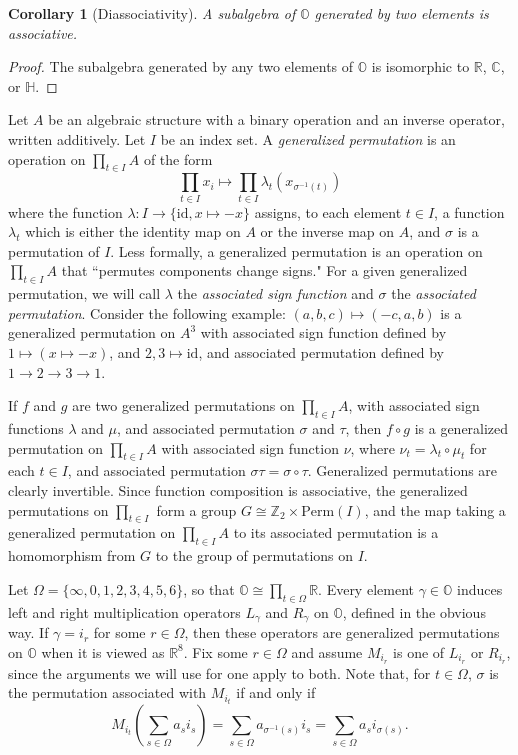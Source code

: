 \documentclass[10pt]{amsart}
\newcommand{\Z}{\mathbb{Z}}
\newcommand{\R}{\mathbb{R}}
\newcommand{\C}{\mathbb{C}}
\renewcommand{\H}{\mathbb{H}}
\renewcommand{\O}{\mathbb{O}}
\newtheorem{cor}[thm]{Corollary}
\begin{document}
\begin{cor}[Diassociativity]
\normalfont
A subalgebra of $\O$ generated by two elements is associative.
\end{cor}
\begin{proof}
The subalgebra generated by any two elements of $\O$ is isomorphic to $\R$, $\C$, or $\H$.
\end{proof}

Let $A$ be an algebraic structure with a binary operation and an inverse operator, written additively. Let $I$ be an index set.  A \emph{generalized permutation} is an operation on $\prod_{t \in I} A$ of the form
$$
\prod_{t \in I} x_i \mapsto \prod_{t \in I}\lambda_t (x_{\sigma^{-1}(t)})
$$
where the function $\lambda: I \rightarrow \{\text{id}, x \mapsto -x\}$ assigns, to each element $t \in I$, a function $\lambda_t$ which is either the identity map on $A$ or the inverse map on $A$, and $\sigma$ is a permutation of $I$.  Less formally, a generalized permutation is an operation on $\prod_{t \in I} A$ that ``permutes components change signs."  For a given generalized permutation, we will call $\lambda$ the \emph{associated sign function} and $\sigma$ the \emph{associated permutation}.  Consider the following example: $(a,b,c) \mapsto (-c,a,b)$ is a generalized permutation on $A^3$ with associated sign function defined by $1 \mapsto (x \mapsto -x)$, and $2,3 \mapsto \text{id}$, and associated permutation defined by $1 \rightarrow 2 \rightarrow 3 \rightarrow 1$.

If $f$ and $g$ are two generalized permutations on $\prod_{t \in I} A$, with associated sign functions $\lambda$ and $\mu$, and associated permutation $\sigma$ and $\tau$, then $f \circ g$ is a generalized permutation on $\prod_{t \in I} A$ with associated sign function $\nu$, where $\nu_t = \lambda_t \circ \mu_t$ for each $t \in I$, and associated permutation $\sigma\tau = \sigma \circ \tau$.  Generalized permutations are clearly invertible.  Since function composition is associative, the generalized permutations on $\prod_{t \in I}$ form a group $G \cong \Z_2 \times \text{Perm}(I)$, and the map taking a generalized permutation on $\prod_{t \in I} A$ to its associated permutation is a homomorphism from $G$ to the group of permutations on $I$.

Let $\Omega = \{\infty,0,1,2,3,4,5,6\}$, so that $\O \cong \prod_{t \in \Omega}\R$.  Every element $\gamma \in \O$ induces left and right multiplication operators $L_\gamma$ and $R_\gamma$ on $\O$, defined in the obvious way.  If $\gamma = i_r$ for some $r \in \Omega$, then these operators are generalized permutations on $\O$ when it is viewed as $\R^8$.  Fix some $r \in \Omega$ and assume $M_{i_r}$ is one of $L_{i_r}$ or $R_{i_r}$, since the arguments we will use for one apply to both.  Note that, for $t \in \Omega$, $\sigma$ is the permutation associated with $M_{i_t}$ if and only if
$$
M_{i_t}\left( \sum_{s \in \Omega} a_s i_s \right) = \sum_{s \in \Omega} a_{\sigma^{-1}(s)} i_s = \sum_{s \in \Omega} a_s i_{\sigma(s)}.
$$
\end{document}
